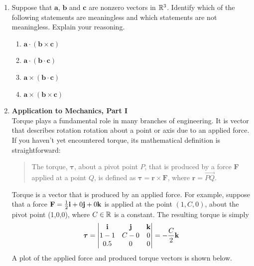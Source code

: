 \documentclass{article}
\begin{document}
\begin{enumerate}
\begin{enumerate}
\end{enumerate}
\item 
Suppose that $\mathbf{a}$, $\mathbf{b}$ and $\mathbf{c}$ are nonzero vectors in $\mathbb{R}^3$. Identify which of the following statements are meaningless and which statements are not meaningless. Explain your reasoning.
\begin{enumerate}
\item  $\mathbf{a}\cdot (\mathbf{b} \times \mathbf{c})$ 
\item  $\mathbf{a}\cdot (\mathbf{b} \cdot \mathbf{c})$ 
\item  $\mathbf{a}\times (\mathbf{b} \cdot \mathbf{c})$ 
\item  $\mathbf{a}\times (\mathbf{b} \times \mathbf{c})$ 
\end{enumerate}
\item \textbf{Application to Mechanics, Part I} \\
Torque plays a fundamental role in many branches of engineering. It is vector that describes rotation rotation about a point or axis due to an applied force. If you haven't yet encountered torque, its mathematical definition is straightforward:
\begin{quote}
The torque, $\boldsymbol\tau$, about a pivot point $P$, that is produced by a force \textbf{F} applied at a point $Q$, is defined as $\boldsymbol\tau = \mathbf{r} \times \mathbf{F}$, where $\mathbf{r}=\overrightarrow{PQ}$.
\end{quote}
Torque is a vector that is produced by an applied force. For example, suppose that a force $\mathbf{F}=\frac{1}{2}\mathbf{i} + 0\mathbf{j} + 0\mathbf{k}$ is applied at the point $(1,C,0)$, about the pivot point (1,0,0), where $C\in\mathbb{R}$ is a constant. The resulting torque is simply 
\begin{align*}
\boldsymbol\tau =   
\begin{vmatrix}
   \mathbf{i} &  \mathbf{j} &  \mathbf{k} \\
   1-1 &  C-0 &  0 \\
   0.5 & 0 &  0 \\
  \end{vmatrix}=-\frac{C}{2}\mathbf{k}
\end{align*} 
A plot of the applied force and produced torque vectors is shown below.
\begin{figure}[!htbp]
  \begin{center}

\end{center}
\end{figure}
\end{enumerate}
\end{document}
